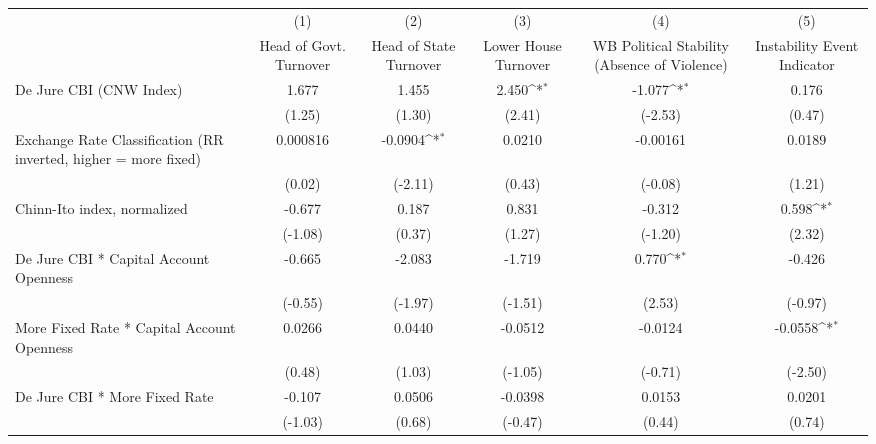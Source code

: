 {
\def\sym#1{\ifmmode^{#1}\else\(^{#1}\)\fi}
\begin{longtable}{l*{5}{c}}
\toprule\endfirsthead\midrule\endhead\midrule\endfoot\endlastfoot
                &\multicolumn{1}{c}{(1)}&\multicolumn{1}{c}{(2)}&\multicolumn{1}{c}{(3)}&\multicolumn{1}{c}{(4)}&\multicolumn{1}{c}{(5)}\\
                &\multicolumn{1}{c}{Head of Govt. Turnover}&\multicolumn{1}{c}{Head of State Turnover}&\multicolumn{1}{c}{Lower House Turnover}&\multicolumn{1}{c}{WB Political Stability (Absence of Violence)}&\multicolumn{1}{c}{Instability Event Indicator}\\
\midrule
De Jure CBI (CNW Index)&    1.677         &    1.455         &    2.450\sym{*}  &   -1.077\sym{*}  &    0.176         \\
                &   (1.25)         &   (1.30)         &   (2.41)         &  (-2.53)         &   (0.47)         \\
\addlinespace
Exchange Rate Classification (RR inverted, higher = more fixed)& 0.000816         &  -0.0904\sym{*}  &   0.0210         & -0.00161         &   0.0189         \\
                &   (0.02)         &  (-2.11)         &   (0.43)         &  (-0.08)         &   (1.21)         \\
\addlinespace
Chinn-Ito index, normalized&   -0.677         &    0.187         &    0.831         &   -0.312         &    0.598\sym{*}  \\
                &  (-1.08)         &   (0.37)         &   (1.27)         &  (-1.20)         &   (2.32)         \\
\addlinespace
De Jure CBI * Capital Account Openness&   -0.665         &   -2.083         &   -1.719         &    0.770\sym{*}  &   -0.426         \\
                &  (-0.55)         &  (-1.97)         &  (-1.51)         &   (2.53)         &  (-0.97)         \\
\addlinespace
More Fixed Rate * Capital Account Openness&   0.0266         &   0.0440         &  -0.0512         &  -0.0124         &  -0.0558\sym{*}  \\
                &   (0.48)         &   (1.03)         &  (-1.05)         &  (-0.71)         &  (-2.50)         \\
\addlinespace
De Jure CBI * More Fixed Rate&   -0.107         &   0.0506         &  -0.0398         &   0.0153         &   0.0201         \\
                &  (-1.03)         &   (0.68)         &  (-0.47)         &   (0.44)         &   (0.74)         \\

\end{longtable}}
